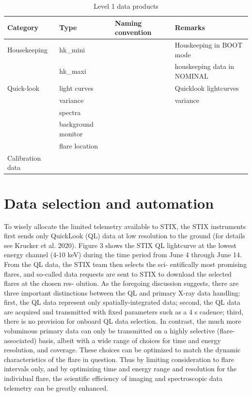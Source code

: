 \documentclass[referee]{aa} %
\begin{document}
\begin{table}
\centering
\caption{Level 1 data products}
\begin{tabular}{llll}
Category & Type   &  Naming convention  & Remarks   \\ \hline
 Housekeeping & hk\_mini  &  & Houskeeping in BOOT mode   \\
 & hk\_maxi  &  & houskeeping data in NOMINAL   \\
 Quick-look &  light curves &  & Quicklook lightcurves \\
  &  variance &  & variance \\
  &  spectra &  &  \\
  &  background monitor &  &  \\
    &  flare location &  &  \\
 Calibration data &   &  &  \\
\end{tabular}
\end{table}

\section{Data selection and automation}
To wisely allocate the limited telemetry available to STIX,
the STIX instruments first sends only QuickLook (QL) data at
low resolution to the ground (for details see Krucker et al. 2020).
Figure 3 shows the STIX QL lightcurve at the lowest energy
channel (4-10 keV) during the time period from June 4 through
June 14. From the QL data, the STIX team then selects the sci-
entifically most promising flares, and so-called data requests are
sent to STIX to download the selected flares at the chosen res-
olution.
As the foregoing discussion suggests,
 there are three important distinctions between the 
 QL and primary X-ray data handling: first, the QL data represent only 
 spatially-integrated data;  second, the QL data are acquired and 
 transmitted with fixed parameters such as a 4 s cadence; third, there is no 
 provision for onboard QL data selection. 
In contrast, the much more voluminous primary data can only 
be transmitted on a highly selective (flare-associated) basis, albeit with a wide range of choices for time and energy
 resolution, and coverage. These choices can be optimized to match the dynamic characteristics of the flare in question.  
  Thus by limiting consideration to flare intervals only, and by optimizing time and energy range and 
 resolution for the individual flare, the scientific efficiency of imaging and spectroscopic data telemetry can be greatly enhanced.
\end{document}
